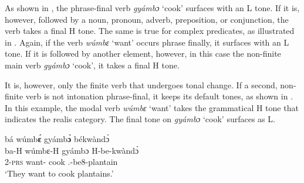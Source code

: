 \eabox{\label{MetaPOS}
\begin{tabular}{llll}
a. & mɛ́ gyámbɔ̀ &  `I cook.' & \\
b. &  mɛ́ gyámbɔ́ bé-kwàndɔ̀&  `I cook plantains.' &  $\underline{\quad}$\textsc{n} \\
c. &   mɛ́ gyámbɔ́ byɔ̂ &  `I cook it.' & $\underline{\quad}${\PRO} \\
d. &  mɛ́ gyámbɔ́ ndáà &   `I cook today.' &  $\underline{\quad}${\ADV} \\
e. &   mɛ́ gyámbɔ́ ɛ́ kìsíní dé tù &   `I cook in the kitchen.' &  $\underline{\quad}${\PREP} \\
f. & mɛ́ gyámbɔ́ nà wɔ́mbɛ̀lɛ̀ &  `I cook and sweep.' &  $\underline{\quad}${\CONJ} \\
\end{tabular}
}

\noindent As shown in , the phrase-final verb {\itshape gyámbɔ} `cook' surfaces with an L tone. If it is, however, followed by a noun, pronoun, adverb, preposition, or conjunction, the verb takes a final H tone. The same is true for complex predicates, as illustrated in . Again, if the verb {\itshape wúmbɛ} `want' occurs phrase finally, it surfaces with an L tone. If it is followed by another element, however, in this case the non-finite main verb {\itshape gyámbɔ} `cook', it takes a final H tone.


It is, however, only the finite verb that undergoes tonal change. If a second, non-finite verb is not intonation phrase-final, it keeps its default tones, as shown in . In this example, the modal verb {\itshape wúmbɛ} `want' takes the grammatical H tone that indicates the realis category. The final tone on {\itshape gyámbɔ} `cook' surfaces as L.


\ea\label{MetaPOS2}
  \glll     bá wúmb{\bfseries ɛ́} gyámb{\bfseries ɔ̀} békwàndɔ̀\\
             ba-H wúmbɛ-H gyámbɔ H-be-kwàndɔ̀ \\
              2-\textsc{prs} want-{\R} cook {\OBJ}.{\LINK}-be8-plantain\\
    \trans `They want to cook plantains.'
\z


















